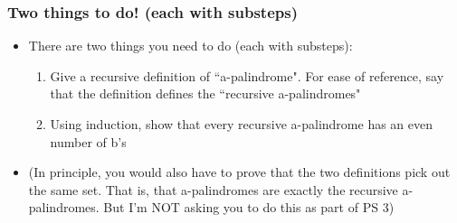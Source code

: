 \begin{frame}
\frametitle{Two things to do! (each with substeps)}

\begin{itemize}[<+->]
\item There are two things you need to do (each with substeps): 

\begin{enumerate}

\item Give a recursive definition of ``a-palindrome". For ease of reference, say that the definition defines the ``recursive a-palindromes"

\item Using induction, show that every recursive a-palindrome has an even number of b's
\end{enumerate}

\item (In principle, you would also have to prove that the two definitions pick out the same set. That is, that a-palindromes are exactly the recursive a-palindromes. But I'm NOT asking you to do this as part of PS 3)

\end{itemize} 
\end{frame}

